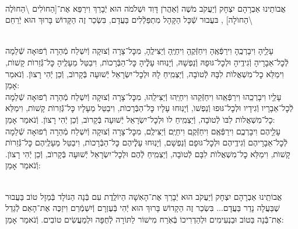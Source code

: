 \documentclass[twoside, openany, parskip=half, 11pt]{book}
\begin{document}
\begin{small}

\\
אֲבוֹתֵינוּ אַבְרָהָם יִצְחָק וְֿיַעֲקֹב מֹשֶׁה וְֿאַהֲרֹן דָּוִד וּשְׁלֹמֹה הוּא יְֿבָרֵךְ וִירַפֵּא אֶת־[הַחוׂלִים \textbackslash הַחוׂלֶה \textbackslash הַחוׂלָה]
,
בּעֲבוּר שְֿׁכָּל הַקָּהָל מִתְפַּלְֿלִים בַּעֲדָם, בִּשְׂכַר זֶה
הַקָּדוֹשׁ בָּרוּךְ הוּא יְֿרַחֵם
\setcolumnwidth{1.4in,1.4in,1.4in}
\begin{paracol}{3}
\\
עָלֵָיהָ וִיבָרְכֶֽהָ וִירַפְּֿאֶֽהָ וִיחַזְּֿקֶֽהָ וִיחַיֶּֽהָ וְֿיַצִּילֶֽהָ, מִכׇּל־צָרָה וְֿצוּקָה וְֿיִשְׁלַח מְֿהֵרָה רְֿפוּאָה שְֿׁלֵמָה לְֿכׇל־אֵבָרָיהָ וְֿגִידֶֽיהָ וּלְכׇל־גּוּפָהּ וְֿנַפְשָׁהּ, וְֿיָנֽוּחוּ עָלְֶֿיהָ כׇּל־הַבְּֿרָכוׂת, וִיבַטֵּל מֵעָלֶֽיהָ כׇּל־גְּֿֿזֵרוׂת קָשׁוׂת, וִימַלֵּא כׇל־מִשְׁאֲלוׂת לִבָּהּ לְֿטוׂבָה, וְֿיַצְמִֽיחַ לָהּ וּלְכׇל־יִשְׂרָאֵל יְֿשׁוּעָה בְּֿקָרוׂב, וְֿכֵן יְֿהִי רָצוׂן. וְֿנֹאמַר אָמֵן:
\switchcolumn
{}\\
עָלֵָיו וִיבָרְכֵֽהוּ וִירַפְּֿאֵֽהוּ וִיחַזְּֿקֵהוּ וִיחַיֵּֽהוּ וְֿיַצִּילֵֽהוּ, מִכׇּל־צָרָה וְֿצוּקָה וְֿיִשְׁלַח מְֿהֵרָה רְֿפוּאָה שְֿׁלֵמָה לְֿכׇל־אֵבָרָיו וְֿגִידָיו וּלְכׇל־גּוּפוּ וְֿנַפְשׁוׂ, וְֿיָנֽוּחוּ עָלָיו כׇּל־הַבְּֿרָכוׂת, וִיבַטֵּל מֵעָלָיו כׇּל־גְּֿֿזֵרוׂת קָשׁוׂת, וִימַלֵּא כׇל־מִשְׁאֲלוׂת לִבּוׂ לְֿטוׂבָה, וְֿיַצְמִֽיחַ לוׂ וּלְכׇל־יִשְׂרָאֵל יְֿשׁוּעָה בְּֿקָרוׂב, וְֿכֵן יְֿהִי רָצוׂן. וְֿנֹאמַר אָמֵן:
\switchcolumn
{}\\
עָלֵָיהֶם וִיבָרְכְֶם וִירַפְּֿאֶֽם וִיחַזְּֿקֶֽם וִיחַיֶּֽם וְֿיַצִּילֶֽם, מִכׇּל־צָרָה וְֿצוּקָה וְֿיִשְׁלַח מְֿהֵרָה רְֿפוּאָה שְֿׁלֵמָה לְֿכׇל־אֵבָרָיהֶם וְֿגִידֶֽיהֶם וּלְכׇל־גּוּפָם וְֿנַפְשָׁם, וְֿיָנֽוּחוּ עָלְֶֿיהֶם כׇּל־הַבְּֿרָכוׂת, וִיבַטֵּל מֵעָלֶֽיהֶם כׇּל־גְּֿֿזֵרוׂת קָשׁוׂת, וִימַלֵּא כׇל־מִשְׁאֲלוׂת לִבָּם לְֿטוׂבָה, וְֿיַצְמִֽיחַ לְֿהֶם וּלְכׇל־יִשְׂרָאֵל יְֿשׁוּעָה בְּֿקָרוׂב, וְֿכֵן יְֿהִי רָצוׂן. וְֿנֹאמַר אָמֵן:
\end{paracol}

\vspace{\baselineskip}

\\
אֲבוֹתֵֽינוּ אַבְרָהָם יִצְחָק וְֿיַעֲקֹב הוּא יְֿבָרֵךְ אֶת־הָאִשָׁה הַיוֹלֶֽדֶת
עִם בְּֿנָה הַנוֹלָד בְּֿמַזָל טוֹב בַּעֲבוּר שֶׁבַּעֲלָה נָדַר בַּעֲדָם... בִּשְׂכַר זֶה הַקָדוֹשׁ בָּרוּךְ הוּא יְֿהִי בְּֿעֶזְרָם וְֿיִשְׁמְֿרֵם וִיזַכֶּה אֶת־הָאֵם לְֿגַדֵל אֶת־בְּֿֿנָה בַּטוֹב וּבַנְעִימִים וּלְהַדְרִיכוֹ בְּֿאֹֽרַח מִישׁוֹר לַתּוֹרָה לְֿחֻפָּה וּלְמַעֲשִׂים טוֹבִים. וְֿנֹאמַר אָמֵן:


\end{small}
\end{document}
